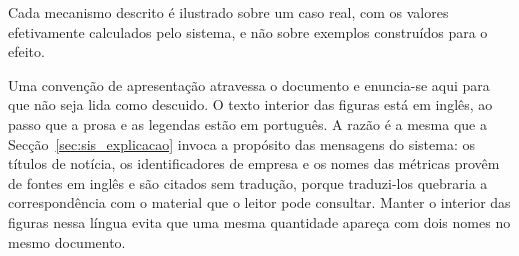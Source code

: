 Cada mecanismo descrito é ilustrado sobre um caso real, com os valores efetivamente calculados
pelo sistema, e não sobre exemplos construídos para o efeito.

Uma convenção de apresentação atravessa o documento e enuncia-se aqui para que não seja
lida como descuido. O texto interior das figuras está em inglês, ao passo que a prosa e as
legendas estão em português. A razão é a mesma que a Secção~\ref{sec:sis_explicacao} invoca
a propósito das mensagens do sistema: os títulos de notícia, os identificadores de empresa e
os nomes das métricas provêm de fontes em inglês e são citados sem tradução, porque traduzi-los
quebraria a correspondência com o material que o leitor pode consultar. Manter o interior das
figuras nessa língua evita que uma mesma quantidade apareça com dois nomes no mesmo documento.
